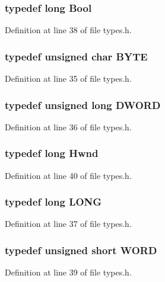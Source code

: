 \subsubsection[{\-Bool}]{\setlength{\rightskip}{0pt plus 5cm}typedef long {\bf \-Bool}}\label{types_8h_abd27050f4bdf8cc534baa76f3fb67a0a}


\-Definition at line 38 of file types.\-h.

\subsubsection[{\-B\-Y\-T\-E}]{\setlength{\rightskip}{0pt plus 5cm}typedef unsigned char {\bf \-B\-Y\-T\-E}}\label{types_8h_a4ae1dab0fb4b072a66584546209e7d58}


\-Definition at line 35 of file types.\-h.

\subsubsection[{\-D\-W\-O\-R\-D}]{\setlength{\rightskip}{0pt plus 5cm}typedef unsigned long {\bf \-D\-W\-O\-R\-D}}\label{types_8h_ad342ac907eb044443153a22f964bf0af}


\-Definition at line 36 of file types.\-h.

\subsubsection[{\-Hwnd}]{\setlength{\rightskip}{0pt plus 5cm}typedef long {\bf \-Hwnd}}\label{types_8h_a8862ac3335826971ccc07e094aa6586d}


\-Definition at line 40 of file types.\-h.

\subsubsection[{\-L\-O\-N\-G}]{\setlength{\rightskip}{0pt plus 5cm}typedef long {\bf \-L\-O\-N\-G}}\label{types_8h_a2a3e0cda5f1249bef6db47c5eb8e3813}


\-Definition at line 37 of file types.\-h.

\subsubsection[{\-W\-O\-R\-D}]{\setlength{\rightskip}{0pt plus 5cm}typedef unsigned short {\bf \-W\-O\-R\-D}}\label{types_8h_a197942eefa7db30960ae396d68339b97}


\-Definition at line 39 of file types.\-h.

